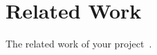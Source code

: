 \section{Related Work}
\label{sec:related_work}

The related work of your project~\cite{Dijkstra:SOSP:1967}.
